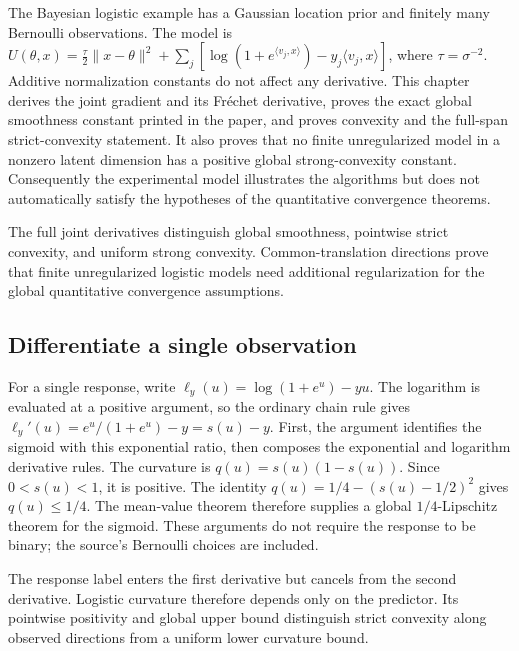 \documentclass[11pt,a4paper]{report}
\begin{document}
The Bayesian logistic example has a Gaussian location prior and finitely many Bernoulli observations. The model is \(U(\theta,x)=\frac{\tau}{2}\|x-\theta\|^2+\sum_j[\log(1+e^{\langle v_j,x\rangle})-y_j\langle v_j,x\rangle]\), where \(\tau=\sigma^{-2}\). Additive normalization constants do not affect any derivative. This chapter derives the joint gradient and its Fréchet derivative, proves the exact global smoothness constant printed in the paper, and proves convexity and the full-span strict-convexity statement. It also proves that no finite unregularized model in a nonzero latent dimension has a positive global strong-convexity constant. Consequently the experimental model illustrates the algorithms but does not automatically satisfy the hypotheses of the quantitative convergence theorems.



The full joint derivatives distinguish global smoothness, pointwise strict convexity, and uniform strong convexity. Common-translation directions prove that finite unregularized logistic models need additional regularization for the global quantitative convergence assumptions.

\subsection{\texorpdfstring{Differentiate a single observation}{Differentiate a single observation}}
\label{report-step-KIPLMC-LogisticExample-lean-1}


For a single response, write \(\ell_y(u)=\log(1+e^u)-yu\). The logarithm is evaluated at a positive argument, so the ordinary chain rule gives \(\ell_y'(u)=e^u/(1+e^u)-y=s(u)-y\). First, the argument identifies the sigmoid with this exponential ratio, then composes the exponential and logarithm derivative rules. The curvature is \(q(u)=s(u)(1-s(u))\). Since \(0<s(u)<1\), it is positive. The identity \(q(u)=1/4-(s(u)-1/2)^2\) gives \(q(u)\le1/4\). The mean-value theorem therefore supplies a global \(1/4\)-Lipschitz theorem for the sigmoid. These arguments do not require the response to be binary; the source's Bernoulli choices are included.



The response label enters the first derivative but cancels from the second derivative. Logistic curvature therefore depends only on the predictor. Its pointwise positivity and global upper bound distinguish strict convexity along observed directions from a uniform lower curvature bound.
\end{document}
